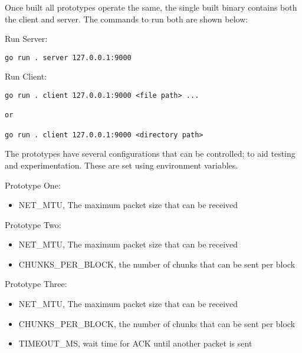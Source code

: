 Once built all prototypes operate the same, the single built binary contains both the client and server. The commands to run both are shown below:

Run Server:

\begin{lstlisting}
go run . server 127.0.0.1:9000
\end{lstlisting}

Run Client:

\begin{lstlisting}
go run . client 127.0.0.1:9000 <file path> ...

or

go run . client 127.0.0.1:9000 <directory path>
\end{lstlisting}

The prototypes have several configurations that can be controlled; to aid testing and experimentation. These are set using environment variables.

Prototype One:

\begin{itemize}
    \item NET\_MTU, The maximum packet size that can be received
\end{itemize}

Prototype Two:

\begin{itemize}
    \item NET\_MTU, The maximum packet size that can be received
    \item CHUNKS\_PER\_BLOCK, the number of chunks that can be sent per block
\end{itemize}

Prototype Three:

\begin{itemize}
    \item NET\_MTU, The maximum packet size that can be received
    \item CHUNKS\_PER\_BLOCK, the number of chunks that can be sent per block
    \item TIMEOUT\_MS, wait time for ACK until another packet is sent
\end{itemize}

